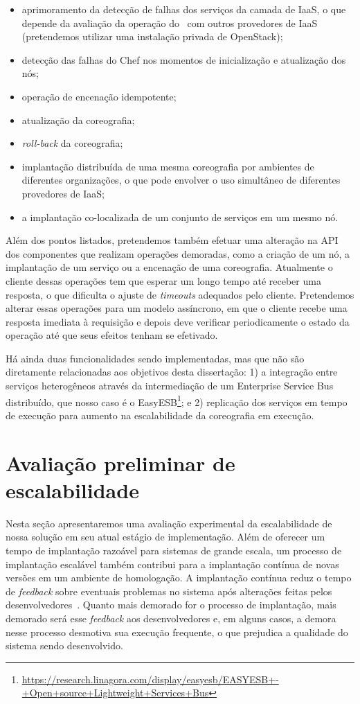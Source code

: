 \begin{itemize}
\item aprimoramento da detecção de falhas dos serviços da camada de IaaS, o que depende da avaliação da operação do \ee\ com outros provedores de IaaS (pretendemos utilizar uma instalação privada de OpenStack);
\item detecção das falhas do Chef nos momentos de inicialização e atualização dos nós;
\item operação de encenação idempotente;
\item atualização da coreografia;
\item \textit{roll-back} da coreografia;
\item implantação distribuída de uma mesma coreografia por ambientes de diferentes organizações, o que pode envolver o uso simultâneo de diferentes provedores de IaaS;
\item a implantação co-localizada de um conjunto de serviços em um mesmo nó.
\end{itemize}

Além dos pontos listados, pretendemos também efetuar uma alteração na API dos componentes que realizam operações demoradas, como a criação de um nó, a implantação de um serviço ou a encenação de uma coreografia. Atualmente o cliente dessas operações tem que esperar um longo tempo até receber uma resposta, o que dificulta o ajuste de \textit{timeouts} adequados pelo cliente. Pretendemos alterar essas operações para um modelo assíncrono, em que o cliente recebe uma resposta imediata à requisição e depois deve verificar periodicamente o estado da operação até que seus efeitos tenham se efetivado.

Há ainda duas funcionalidades sendo implementadas, mas que não são diretamente relacionadas aos objetivos desta dissertação: 1) a integração entre serviços heterogêneos através da intermediação de um Enterprise  Service Bus distribuído, que nosso caso é o EasyESB\footnote{\url{https://research.linagora.com/display/easyesb/EASYESB+-+Open+source+Lightweight+Services+Bus}}; e 2) replicação dos serviços em tempo de execução para aumento na escalabilidade da coreografia em execução.

\section{Avaliação preliminar de escalabilidade}
\label{sec:avaliacao}

Nesta seção apresentaremos uma avaliação experimental da escalabilidade de nossa solução em seu atual estágio de implementação. Além de oferecer um tempo de implantação razoável para sistemas de grande escala, um processo de implantação escalável também contribui para a implantação contínua de novas versões em um ambiente de homologação. A implantação contínua reduz o tempo de \textit{feedback} sobre eventuais problemas no sistema após alterações feitas pelos desenvolvedores~\cite{Humble2011Continuous}. Quanto mais demorado for o processo de implantação, mais demorado será esse \textit{feedback} aos desenvolvedores e, em alguns casos, a demora nesse processo desmotiva sua execução frequente, o que prejudica a qualidade do sistema sendo desenvolvido.


